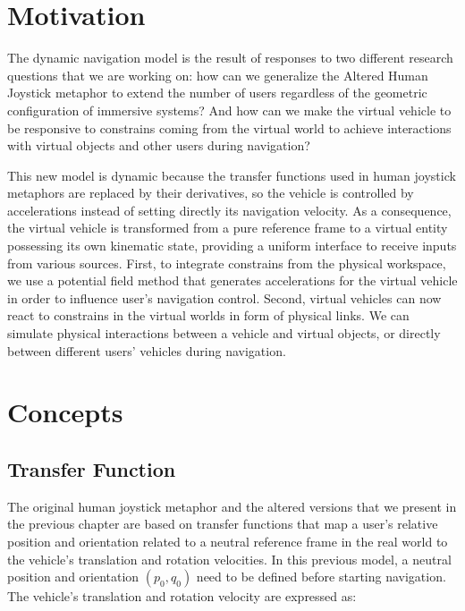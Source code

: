 
\section{Motivation}
The dynamic navigation model is the result of responses to two different research questions that we are working on: how can we generalize the Altered Human Joystick metaphor to extend the number of users regardless of the geometric configuration of immersive systems? And how can we make the virtual vehicle to be responsive to constrains coming from the virtual world to achieve interactions with virtual objects and other users during navigation?

This new model is dynamic because the transfer functions used in human joystick metaphors are replaced by their derivatives, so the vehicle is controlled by accelerations instead of setting directly its navigation velocity. As a consequence, the virtual vehicle is transformed from a pure reference frame to a virtual entity possessing its own kinematic state, providing a uniform interface to receive inputs from various sources. First, to integrate constrains from the physical workspace, we use a potential field method that generates accelerations for the virtual vehicle in order to influence user's navigation control. Second, virtual vehicles can now react to constrains in the virtual worlds in form of physical links. We can simulate physical interactions between a vehicle and virtual objects, or directly between different users' vehicles during navigation. 




\section{Concepts}

\subsection{Transfer Function}
The original human joystick metaphor and the altered versions that we present in the previous chapter are based on transfer functions that map a user's relative position and orientation related to a neutral reference frame in the real world to the vehicle's translation and rotation velocities. In this previous model, a neutral position and orientation $(p_{0},q_{0})$ need to be defined before starting navigation. The vehicle's translation and rotation velocity are expressed as:

